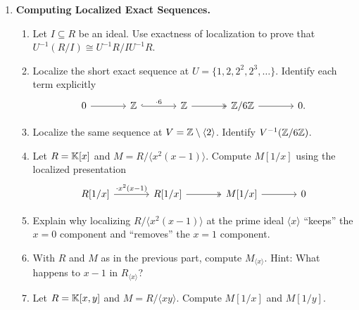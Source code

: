 \documentclass[12pt,reqno]{amsart}
\begin{document}
\begin{enumerate}[leftmargin=*, resume=problems]
\item \textbf{Computing Localized Exact Sequences.}
\begin{enumerate}
\item Let $I\subseteq R$ be an ideal. Use exactness of localization to prove that $U^{-1}(R/I)\cong U^{-1}R/IU^{-1}R$.
\item Localize the short exact sequence at $U=\{1,2,2^2,2^3,\ldots\}$. Identify each term explicitly
\[
\begin{tikzcd}[column sep=large]
0 \arrow[r] & \ZZ \arrow[r, hook, "\cdot 6"] & \ZZ \arrow[r, two heads] & \ZZ/6\ZZ \arrow[r] & 0.
\end{tikzcd}
\]
\item Localize the same sequence at $V=\mathbb{Z}\setminus \langle 2\rangle$. Identify $V^{-1}(\mathbb{Z}/6\mathbb{Z})$.
\item Let $R=\mathbb{K}[x]$ and $M=R/\langle x^2(x-1)\rangle$. Compute $M[1/x]$ using the localized presentation
\[
\begin{tikzcd}[column sep=large]
R[1/x] \arrow[r, "\cdot x^2(x-1)"] & R[1/x] \arrow[r, two heads] & M[1/x] \arrow[r] & 0
\end{tikzcd}
\]
\item Explain why localizing $R/\langle x^2(x-1)\rangle$ at the prime ideal $\langle x\rangle$ “keeps” the $x=0$ component and “removes” the $x=1$ component.
\item With $R$ and $M$ as in the previous part, compute $M_{\langle x\rangle}$. Hint: What happens to $x-1$ in $R_{\langle x\rangle}$?
\item Let $R=\mathbb{K}[x,y]$ and $M=R/\langle xy\rangle$. Compute $M[1/x]$ and $M[1/y]$.
\end{enumerate}
\end{enumerate}
\end{document}
